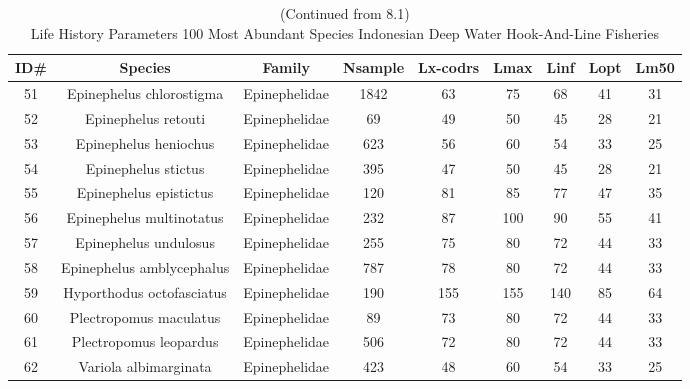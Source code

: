 \documentclass{report}\usepackage[]{graphicx}\usepackage[]{color}
\begin{document}
\clearpage
\newpage%
{\small
\begin{longtable}{ccccccccc}
\caption{(Continued from 8.1)\\Life History Parameters 100 Most Abundant Species Indonesian Deep Water Hook-And-Line Fisheries} \\ 
  \hline
ID\# & Species & Family & Nsample & Lx-codrs & Lmax & Linf & Lopt & Lm50 \\ 
  \hline
51 & Epinephelus chlorostigma & Epinephelidae & 1842 & 63 & 75 & 68 & 41 & 31 \\ 
  52 & Epinephelus retouti & Epinephelidae & 69 & 49 & 50 & 45 & 28 & 21 \\ 
  53 & Epinephelus heniochus & Epinephelidae & 623 & 56 & 60 & 54 & 33 & 25 \\ 
  54 & Epinephelus stictus & Epinephelidae & 395 & 47 & 50 & 45 & 28 & 21 \\ 
  55 & Epinephelus epistictus & Epinephelidae & 120 & 81 & 85 & 77 & 47 & 35 \\ 
  56 & Epinephelus multinotatus & Epinephelidae & 232 & 87 & 100 & 90 & 55 & 41 \\ 
  57 & Epinephelus undulosus & Epinephelidae & 255 & 75 & 80 & 72 & 44 & 33 \\ 
  58 & Epinephelus amblycephalus & Epinephelidae & 787 & 78 & 80 & 72 & 44 & 33 \\ 
  59 & Hyporthodus octofasciatus & Epinephelidae & 190 & 155 & 155 & 140 & 85 & 64 \\ 
  60 & Plectropomus maculatus & Epinephelidae & 89 & 73 & 80 & 72 & 44 & 33 \\ 
  61 & Plectropomus leopardus & Epinephelidae & 506 & 72 & 80 & 72 & 44 & 33 \\ 
  62 & Variola albimarginata & Epinephelidae & 423 & 48 & 60 & 54 & 33 & 25 \\ 

\end{longtable}}
\end{document}
